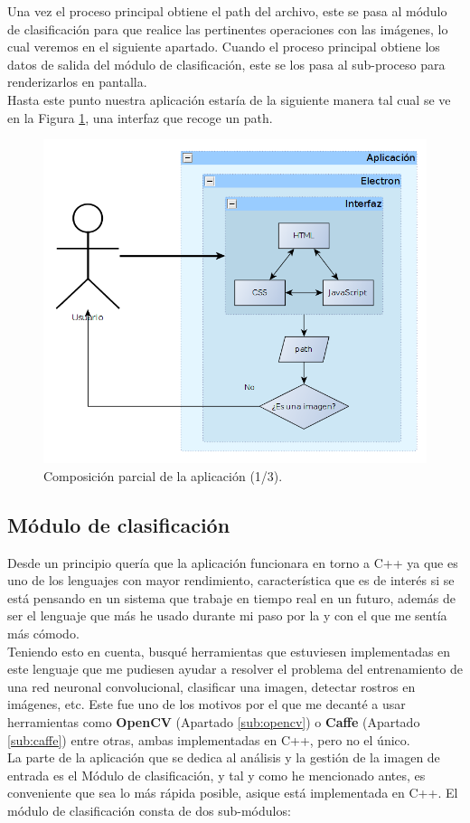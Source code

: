 \documentclass[a4paper,11pt]{book}
\newcommand{\myUni}{\protect{Universidad de Granada}\xspace}
\begin{document}
Una vez el proceso principal obtiene el path del archivo, este se pasa al módulo de clasificación para que realice las pertinentes operaciones con las imágenes, lo cual veremos en el siguiente apartado. Cuando el proceso principal obtiene los datos de salida del módulo de clasificación, este se los pasa al sub-proceso para renderizarlos en pantalla.\\
Hasta este punto nuestra aplicación estaría de la siguiente manera tal cual se ve en la Figura \ref{fig:interfaz}, una interfaz que recoge un path.
\begin{figure}[h]
\centering
\includegraphics[width=0.9\linewidth]{imagenes/interfaz}
\caption[Interfaz]{Composición parcial de la aplicación (1/3).}
\label{fig:interfaz}
\end{figure}


\subsection{Módulo de clasificación}
Desde un principio quería que la aplicación funcionara en torno a C++ ya que es uno de los lenguajes con mayor rendimiento, característica que es de interés si se está pensando en un sistema que trabaje en tiempo real en un futuro, además de ser el lenguaje que más he usado durante mi paso por la \myUni y con el que me sentía más cómodo.\\
Teniendo esto en cuenta, busqué herramientas que estuviesen implementadas en este lenguaje que me pudiesen ayudar a resolver el problema del entrenamiento de una red neuronal convolucional, clasificar una imagen, detectar rostros en imágenes, etc. Este fue uno de los motivos por el que me decanté a usar herramientas como \textbf{OpenCV} (Apartado \ref{sub:opencv}) o \textbf{Caffe} (Apartado \ref{sub:caffe}) entre otras, ambas implementadas en C++, pero no el único.\\
La parte de la aplicación que se dedica al análisis y la gestión de la imagen de entrada es el Módulo de clasificación, y tal y como he mencionado antes, es conveniente que sea lo más rápida posible, asique está implementada en C++. El módulo de clasificación consta de dos sub-módulos:
\end{document}

